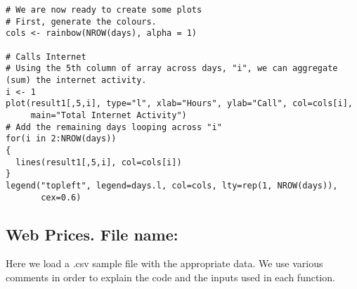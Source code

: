 \documentclass[12pt]{article}
\begin{document}
\begin{lstlisting}[title=\textbf{Mobile Phone Data Aggregation and Plots.}]
# We are now ready to create some plots
# First, generate the colours.
cols <- rainbow(NROW(days), alpha = 1)

# Calls Internet
# Using the 5th column of array across days, "i", we can aggregate (sum) the internet activity.
i <- 1
plot(result1[,5,i], type="l", xlab="Hours", ylab="Call", col=cols[i],
     main="Total Internet Activity")
# Add the remaining days looping across "i"
for(i in 2:NROW(days))
{
  lines(result1[,5,i], col=cols[i])
}
legend("topleft", legend=days.l, col=cols, lty=rep(1, NROW(days)),
       cex=0.6)
\end{lstlisting}

\subsection{Web Prices. File name: \color{blue}{Prices.R}}

Here we load a .csv sample file with the appropriate data. We use various
comments in order to explain the code and the inputs used in each function.
\end{document}
